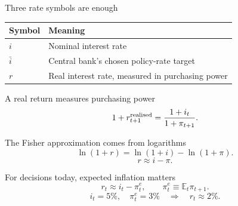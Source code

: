 \documentclass[12pt,aspectratio=169]{beamer}
\begin{document}

\begin{frame}{Three rate symbols are enough}
\begin{center}\begin{tabular}{@{}ll@{}}\toprule \textbf{Symbol} & \textbf{Meaning}\\\midrule $i$ & Nominal interest rate\\[2mm]
$\bar i$ & Central bank’s chosen policy-rate target\\[2mm]
$r$ & Real interest rate, measured in purchasing power\\\bottomrule\end{tabular}\end{center}
\end{frame}


\begin{frame}{A real return measures purchasing power}
\[1+r^{\rm realised}_{t+1}=\frac{1+i_t}{1+\pi_{t+1}}.\]
\end{frame}


\begin{frame}{The Fisher approximation comes from logarithms}
\[\ln(1+r)=\ln(1+i)-\ln(1+\pi).\]\[\boxed{r\approx i-\pi.}\]
\end{frame}


\begin{frame}{For decisions today, expected inflation matters}
\[\boxed{r_t\approx i_t-\pi_t^e,\qquad\pi_t^e\equiv\mathbb E_t\pi_{t+1}.}\]\[i_t=5\%,\quad\pi_t^e=3\%\quad\Rightarrow\quad r_t\approx2\%.\]
\end{frame}

\end{document}

